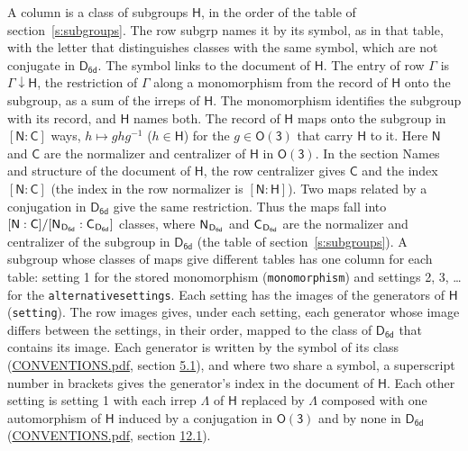 \documentclass[10pt,a4paper]{article}
\numberwithin{equation}{section}
\newcommand{\grp}[1]{\mathsf{#1}}
\newcommand{\grpindex}[2]{[#1 : #2]}
\newcommand{\restr}[2]{#1\!\downarrow#2}
\newcommand{\hairsp}{\mkern1mu}
\begin{document}
A column is a class of subgroups $\grp{H}$, in the order of the table of section~\ref{s:subgroups}. The row subgrp names it by its symbol, as in that table, with the letter that distinguishes classes with the same symbol, which are not conjugate in $\grp{D_{6d}}$. The symbol links to the document of $\grp{H}$. The entry of row $\Gamma$ is $\restr{\Gamma}{\grp{H}}$, the restriction of $\Gamma$ along a monomorphism from the record of $\grp{H}$ onto the subgroup, as a sum of the irreps of $\grp{H}$. The monomorphism identifies the subgroup with its record, and $\grp{H}$ names both. \label{n:group.normalizer.o3}\label{n:group.centralizer.o3}The record of $\grp{H}$ maps onto the subgroup in $\grpindex{\grp{N}}{\grp{C}}$ ways, $h \mapsto g h g^{-1}$ ($h \in \grp{H}$) for the $g \in \grp{O(3)}$ that carry $\grp{H}$ to it. Here $\grp{N}$ and $\grp{C}$ are the normalizer and centralizer of $\grp{H}$ in \href{O3.pdf}{$\grp{O(3)}$}. In the section Names and structure of the document of $\grp{H}$, the row centralizer gives $\grp{C}$ and the index $\grpindex{\grp{N}}{\grp{C}}$ (the index in the row normalizer is $\grpindex{\grp{N}}{\grp{H}}$). Two maps related by a conjugation in $\grp{D_{6d}}$ give the same restriction. Thus the maps fall into $\grpindex{\grp{N}}{\grp{C}}/\grpindex{\grp{N}_{\hairsp \grp{D_{6d}}}}{\grp{C}_{\hairsp \grp{D_{6d}}}}$ classes, where $\grp{N}_{\hairsp \grp{D_{6d}}}$ and $\grp{C}_{\hairsp \grp{D_{6d}}}$ are the normalizer and centralizer of the subgroup in $\grp{D_{6d}}$ (the table of section~\ref{s:subgroups}). \label{n:head.setting}A subgroup whose classes of maps give different tables has one column for each table: setting 1 for the stored monomorphism (\texttt{monomorphism}) and settings 2, 3, \dots{} for the \texttt{alternativesettings}. Each setting has the images of the generators of $\grp{H}$ (\texttt{setting}). \label{n:head.images}The row images gives, under each setting, each generator whose image differs between the settings, in their order, mapped to the class of $\grp{D_{6d}}$ that contains its image. \label{n:element.generator.index}Each generator is written by the symbol of its class (\href{../../CONVENTIONS.pdf}{CONVENTIONS.pdf}, section \href{../../CONVENTIONS.pdf\#conv.5.1}{5.1}), and where two share a symbol, a superscript number in brackets gives the generator's index in the document of $\grp{H}$. \label{n:irrep.Delta}Each other setting is setting 1 with each irrep $\Lambda$ of $\grp{H}$ replaced by $\Lambda$ composed with one automorphism of $\grp{H}$ induced by a conjugation in \href{O3.pdf}{$\grp{O(3)}$} and by none in $\grp{D_{6d}}$ (\href{../../CONVENTIONS.pdf}{CONVENTIONS.pdf}, section \href{../../CONVENTIONS.pdf\#conv.12.1}{12.1}).
\end{document}
